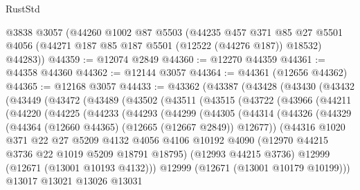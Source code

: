 \begin{lexlean}{RustStd}
\begin{coremodule}
    @3838
    @3057
    (@44260
      @1002
      @87
      @5503
      (@44235
        @457
        @371
        @85
        @27
        @5501
        @4056
        (@44271 @187 @85 @187 @5501 (@12522 (@44276 @187)) @18532)
        @44283))
@44359 := @12074 @2849
@44360 := @12270 @44359
@44361 := @44358 @44360
@44362 := @12144 @3057
@44364 := @44361 (@12656 @44362)
@44365 := @12168 @3057
@44433 := @43362
    (@43387
      (@43428
        (@43430
          (@43432
            (@43449
              (@43472
                (@43489
                  (@43502
                    (@43511
                      (@43515
                        (@43722
                          (@43966
                            (@44211
                              (@44220
                                (@44225
                                  (@44233
                                    (@44293
                                      (@44299
                                        (@44305
                                          (@44314
                                            (@44326
                                              (@44329
                                                (@44364
                                                  (@12660 @44365)
                                                  (@12665 (@12667 @2849))
                                                  @12677))
                                              (@44316
                                                @1020
                                                @371
                                                @22
                                                @27
                                                @5209
                                                @4132
                                                @4056
                                                @4106
                                                @10192
                                                @4090
                                                (@12970 @44215 @3736 @22 @1019 @5209 @18791 @18795)
                                                (@12993 @44215 @3736)
                                                @12999
                                                (@12671 (@13001 @10193 @4132)))
                                              @12999
                                              (@12671 (@13001 @10179 @10199)))
                                            @13017
                                            @13021
                                            @13026
                                            @13031

\end{coremodule}
\end{lexlean}
